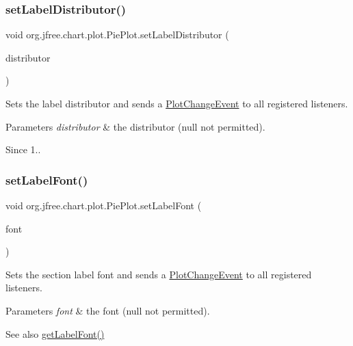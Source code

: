 \subsubsection{\texorpdfstring{set\+Label\+Distributor()}{setLabelDistributor()}}
{\footnotesize\ttfamily void org.\+jfree.\+chart.\+plot.\+Pie\+Plot.\+set\+Label\+Distributor (\begin{DoxyParamCaption}\item[{\mbox{\hyperlink{classorg_1_1jfree_1_1chart_1_1plot_1_1_abstract_pie_label_distributor}{Abstract\+Pie\+Label\+Distributor}}}]{distributor }\end{DoxyParamCaption})}

Sets the label distributor and sends a \mbox{\hyperlink{}{Plot\+Change\+Event}} to all registered listeners.


\begin{DoxyParams}{Parameters}
{\em distributor} & the distributor ({\ttfamily null} not permitted).\\
\hline
\end{DoxyParams}
\begin{DoxySince}{Since}
1.. 
\end{DoxySince}
\mbox{\label{classorg_1_1jfree_1_1chart_1_1plot_1_1_pie_plot_a8c2f0cd7aa743c883a2903d2f46c8e23}} 
\subsubsection{\texorpdfstring{set\+Label\+Font()}{setLabelFont()}}
{\footnotesize\ttfamily void org.\+jfree.\+chart.\+plot.\+Pie\+Plot.\+set\+Label\+Font (\begin{DoxyParamCaption}\item[{Font}]{font }\end{DoxyParamCaption})}

Sets the section label font and sends a \mbox{\hyperlink{}{Plot\+Change\+Event}} to all registered listeners.


\begin{DoxyParams}{Parameters}
{\em font} & the font ({\ttfamily null} not permitted).\\
\hline
\end{DoxyParams}
\begin{DoxySeeAlso}{See also}
\mbox{\hyperlink{classorg_1_1jfree_1_1chart_1_1plot_1_1_pie_plot_aac6ac1fe8df03ac408f23890be3322e8}{get\+Label\+Font()}} 
\end{DoxySeeAlso}
\mbox{\label{classorg_1_1jfree_1_1chart_1_1plot_1_1_pie_plot_a0478fb7b65d5556cb402dac28991c88b}} 
